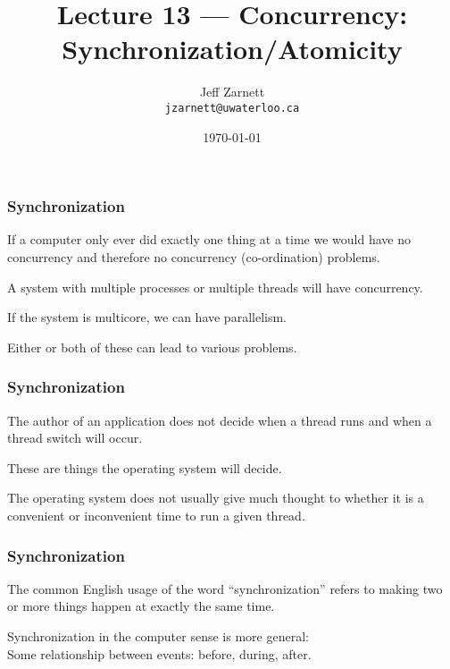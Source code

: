 

\title{Lecture 13 --- Concurrency: Synchronization/Atomicity }

\author{Jeff Zarnett \\ \small \texttt{jzarnett@uwaterloo.ca}}
\date{\today}




\begin{frame}
  \titlepage

 \end{frame}


\begin{frame}
\frametitle{Synchronization}

If a computer only ever did exactly one thing at a time we would have no concurrency and therefore no concurrency (co-ordination) problems. 

A system with multiple processes or multiple threads will have concurrency.

If the system is multicore, we can have parallelism.

Either or both of these can lead to various problems.


\end{frame}

\begin{frame}
\frametitle{Synchronization}

The author of an application does not decide when a thread runs and when a thread switch will occur. 

These are things the operating system will decide. 

The operating system does not usually give much thought to whether it is a convenient or inconvenient time to run a given thread.


\end{frame}

\begin{frame}
\frametitle{Synchronization}

The common English usage of the word ``synchronization'' refers to making two or more things happen at exactly the same time. 

Synchronization in the computer sense is more general:\\
\quad Some relationship between events: before, during, after. 

\end{frame}

